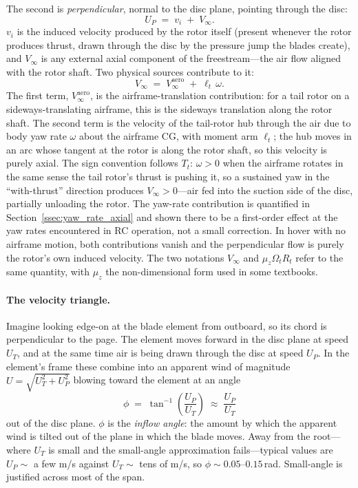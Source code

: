 \documentclass[11pt,a4paper]{article}
\newcommand{\OmegaT}{\Omega_t}
\newcommand{\Rt}{R_t}
\newcommand{\Tt}{T_t}
\newcommand{\vi}{v_i}
\begin{document}
The second is \emph{perpendicular}, normal to the disc plane, pointing
through the disc:
\begin{equation}
U_P \;=\; \vi \;+\; V_\infty.
\end{equation}
\(\vi\) is the induced velocity produced by the rotor itself
(present whenever the rotor produces thrust, drawn through the disc by
the pressure jump the blades create), and \(V_\infty\) is any external
axial component of the freestream---the air flow aligned with the
rotor shaft. Two physical sources contribute to it:
\begin{equation}
V_\infty \;=\; V_\infty^{\text{aero}} \;+\; \ell_t\,\omega.
\label{eq:Vinf_composition}
\end{equation}
The first term, \(V_\infty^{\text{aero}}\), is the airframe-translation
contribution: for a tail rotor on a sideways-translating airframe, this
is the sideways translation along the rotor shaft. The second term is
the velocity of the tail-rotor hub through the air due to body yaw rate
\(\omega\) about the airframe CG, with moment arm \(\ell_t\); the hub
moves in an arc whose tangent at the rotor is along the rotor shaft,
so this velocity is purely axial. The sign convention follows
\(\Tt\): \(\omega>0\) when the airframe rotates in the same sense
the tail rotor's thrust is pushing it, so a sustained yaw in the
``with-thrust'' direction produces \(V_\infty>0\)---air fed into the
suction side of the disc, partially unloading the rotor. The
yaw-rate contribution is quantified in
Section~\ref{ssec:yaw_rate_axial} and shown there to be a first-order
effect at the yaw rates encountered in RC operation, not a small
correction.
In hover with no airframe motion, both contributions vanish and the
perpendicular flow is purely the rotor's own induced velocity. The two
notations \(V_\infty\) and \(\mu_z\OmegaT\Rt\) refer to the same quantity,
with \(\mu_z\) the non-dimensional form used in some textbooks.

\paragraph{The velocity triangle.}
Imagine looking edge-on at the blade element from outboard, so its
chord is perpendicular to the page. The element moves forward in the
disc plane at speed \(U_T\), and at the same time air is being drawn
through the disc at speed \(U_P\). In the element's frame these
combine into an apparent wind of magnitude
\(U = \sqrt{U_T^2 + U_P^2}\) blowing toward the element at an angle
\begin{equation}
\phi \;=\; \tan^{-1}\!\left(\frac{U_P}{U_T}\right)
       \;\approx\; \frac{U_P}{U_T}
\end{equation}
out of the disc plane. \(\phi\) is the \emph{inflow angle}: the amount
by which the apparent wind is tilted out of the plane in which the
blade moves. Away from the root---where \(U_T\) is small and the
small-angle approximation fails---typical values are
\(U_P\sim\) a few m/s against \(U_T\sim\) tens of m/s, so
\(\phi\sim 0.05\)--\(0.15\,\)rad. Small-angle is justified across most
of the span.
\end{document}
